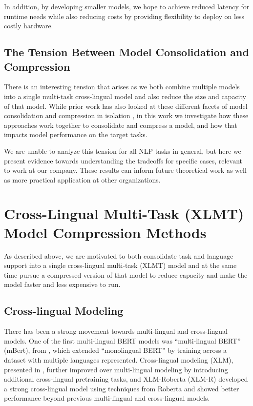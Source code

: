 In addition, by developing smaller models, we hope to achieve reduced latency for runtime needs while also reducing costs by providing flexibility to deploy on less costly hardware.

\subsection{The Tension Between Model Consolidation and Compression}
There is an interesting tension that arises as we both combine multiple models into a single multi-task cross-lingual model and also reduce the size and capacity of that model.
While prior work has also looked at these different facets of model consolidation and compression in isolation \cite{wang2020minilm, wang2020minilmv2, mukherjee2021xtremedistiltransformers, jiao2021lightmbert, sanh2019distilbert, jiao2020tinybert, de2020optimal,yang2019model}, in this work we investigate how these approaches work together to consolidate and compress a model, and how that impacts model performance on the target tasks.

We are unable to analyze this tension for all NLP tasks in general, but here we present evidence towards understanding the tradeoffs for specific cases, relevant to work at our company.
These results can inform future theoretical work as well as more practical application at other organizations.
\section{Cross-Lingual Multi-Task (XLMT) Model Compression Methods}
As described above, we are motivated to both consolidate task and language support into a single cross-lingual multi-task (XLMT) model and at the same time pursue a compressed version of that model to reduce capacity and make the model faster and less expensive to run.

\subsection{Cross-lingual Modeling}
There has been a strong movement towards multi-lingual and cross-lingual models.
One of the first multi-lingual BERT models was ``multi-lingual BERT'' (mBert), from \cite{devlin-etal-2019-bert}, which extended ``monolingual BERT'' by training across a dataset with multiple languages represented.
Cross-lingual modeling (XLM), presented in \cite{conneau2019cross}, further improved over multi-lingual modeling by introducing additional cross-lingual pretraining tasks, and 
XLM-Roberta (XLM-R) \cite{XLMR} developed a strong cross-lingual model using techniques from Roberta \cite{roberta} and showed better performance beyond previous multi-lingual and cross-lingual models.

